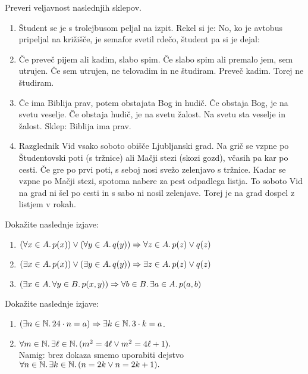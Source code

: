 \begin{vaja}
Preveri veljavnost naslednjih sklepov.

\begin{enumerate}
  \item Študent se je s trolejbusom peljal na izpit. Rekel si je:  No, ko je avtobus pripeljal na križišče, je semafor svetil rdečo, študent pa si je dejal: 
  
  \item Če preveč pijem ali kadim, slabo spim. Če slabo spim ali premalo jem, sem utrujen.
  Če sem utrujen, ne telovadim in ne študiram. Preveč kadim. Torej ne študiram.

  \item  Če ima Biblija prav, potem obstajata Bog in hudič. 
             Če obstaja Bog, je na svetu veselje.
             Če obstaja hudič, je na svetu žalost.
             Na svetu sta veselje in žalost.
             Sklep: Biblija ima prav.

  \item Razglednik Vid vsako soboto obišče Ljubljanski grad. Na grič se vzpne po Študentovski poti (s tržnice) ali Mačji stezi (skozi gozd), včasih pa kar po cesti. Če gre po prvi poti, s seboj nosi svežo zelenjavo s tržnice. Kadar se vzpne po Mačji stezi, spotoma nabere za pest odpadlega listja. To soboto Vid na grad ni šel po cesti in s sabo ni nosil zelenjave. Torej je na grad dospel z listjem v rokah.
\end{enumerate}
\end{vaja}

\begin{vaja}
  Dokažite naslednje izjave:
  \begin{enumerate}
  \item $(\forall x \in A .\, p(x)) \lor (\forall y \in A .\, q(y)) \Rightarrow \forall z \in A .\, p(z) \lor q(z)$
  \item $(\exists x \in A .\, p(x)) \lor (\exists y \in A .\, q(y)) \Rightarrow \exists z \in A .\, p(z) \lor q(z)$
  \item $(\exists x \in A .\, \forall y \in B .\, p(x, y)) \Rightarrow \forall b \in B .\, \exists a \in A .\, p(a, b)$
  \end{enumerate}
\end{vaja}

\begin{vaja}
  Dokažite naslednje izjave:
  \begin{enumerate}
  \item $(\exists n \in \mathbb{N} .\, 24 \cdot n = a) \Rightarrow \exists k \in \mathbb{N} .\, 3 \cdot k = a$.
  \item $\forall m \in \mathbb{N} .\, \exists \ell \in \mathbb{N} .\, (m^2 = 4 \ell \lor m^2 = 4 \ell + 1).$\\
    Namig:  brez dokaza smemo uporabiti dejstvo
    $\forall n \in \mathbb{N} .\, \exists k \in \mathbb{N} .\, (n = 2 k \lor n = 2 k + 1).$
  \end{enumerate}
\end{vaja}

